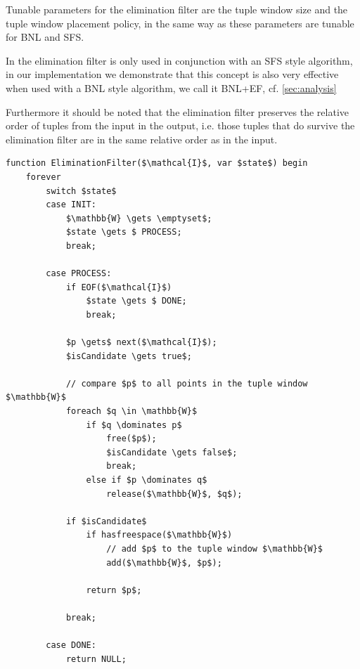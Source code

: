 Tunable parameters for the elimination filter are the tuple window size
and the tuple window placement policy, in the same way as these parameters
are tunable for BNL and SFS.

In  the elimination filter is only used in
conjunction with an SFS style algorithm, in our implementation we demonstrate
that this concept is also very effective when used with a BNL style
algorithm, we call it BNL+EF, cf. \autoref{sec:analysis}

Furthermore it should be noted that the elimination filter preserves
the relative order of tuples from the input in the output, i.e. those
tuples that do survive the elimination filter are in the same relative
order as in the input.

\begin{lstlisting}[language=pseudo,
caption={Pseudo-code for Elimination Filter (EF)},
label={code:ef}
]
function EliminationFilter($\mathcal{I}$, var $state$) begin 
	forever
		switch $state$
		case INIT:
			$\mathbb{W} \gets \emptyset$;
			$state \gets $ PROCESS;
			break;

		case PROCESS:
			if EOF($\mathcal{I}$)
				$state \gets $ DONE;
				break;
	
			$p \gets$ next($\mathcal{I}$);
			$isCandidate \gets true$;

			// compare $p$ to all points in the tuple window $\mathbb{W}$
			foreach $q \in \mathbb{W}$
				if $q \dominates p$
					free($p$);
					$isCandidate \gets false$;
					break;
				else if $p \dominates q$
					release($\mathbb{W}$, $q$);

			if $isCandidate$
				if hasfreespace($\mathbb{W}$)
					// add $p$ to the tuple window $\mathbb{W}$
					add($\mathbb{W}$, $p$);

				return $p$;

			break;

		case DONE:
			return NULL;
\end{lstlisting}


